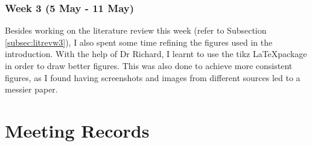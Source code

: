 \documentclass[a4paper, 12pt]{extreport}
\begin{document}
			\subsection{Week 3 (5 May - 11 May)}\label{subsec:revw3}
				
				Besides working on the literature review this week (refer to Subsection \ref{subsec:litrevw3}), I also spent some time refining the figures used in the introduction. With the help of Dr Richard, I learnt to use the tikz \LaTeX package in order to draw better figures. This was also done to achieve more consistent figures, as I found having screenshots and images from different sources led to a messier paper.
		
	\nocite{*}
	\printbibliography[heading={bibnumbered}, title={Bibliography}]
	
	\chapter{Meeting Records}
		
		
		
%		
%		
%		
%		
%		
		
\end{document}
